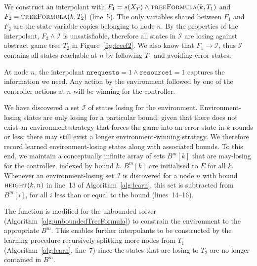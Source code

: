 We construct an interpolant with $F_1 = s(X_T) \land \textsc{treeFormula}(k,
T_1)$ and $F_2 = \textsc{treeFormula}(k, T_2)$ (line~5). The only variables
shared between $F_1$ and $F_2$ are the state variable copies belonging to node
$n$. By the properties of the interpolant, $F_2 \land \mathcal{I}$ is
unsatisfiable, therefore all states in $\mathcal{I}$ are losing against
abstract game tree $T_2$ in Figure~\ref{fig:treef2}.  We also know that $F_1
\to \mathcal{I}$, thus $\mathcal{I}$ contains all states reachable at $n$ by
following $T_1$ and avoiding error states. 

\begin {exmp}

    At node $n$, the interpolant $\texttt{nrequests} = 1 \land
    \texttt{resource1} = 1$ captures the information we need. Any action by the
    environment followed by one of the controller actions at $n$ will be
    winning for the controller.

\end{exmp}

We have discovered a set $\mathcal{I}$ of states losing for the environment.
Environment-losing states are only losing for a particular bound: given that
there does not exist an environment strategy that forces the game into an error
state in $k$ rounds or less; there may still exist a longer environment-winning
strategy.  We therefore record learned environment-losing states along with
associated bounds.  To this end, we maintain a conceptually infinite array of
sets $B^m[k]$ that are may-losing for the controller, indexed by bound $k$.
$B^m[k]$ are initialised to $E$ for all $k$.  Whenever an environment-losing
set $\mathcal{I}$ is discovered for a node $n$ with bound $\textsc{height}(k,
n)$ in line~13 of Algorithm~\ref{alg:learn}, this set is subtracted from
$B^m[i]$, for all $i$ less than or equal to the bound (lines~14--16).

The \textsc{} function is modified for the unbounded
solver (Algorithm~\ref{alg:unboundedTreeFormula}) to constrain the environment
to the appropriate $B^m$. This enables further interpolants to be constructed
by the learning procedure recursively splitting more nodes from $T_1$
(Algorithm~\ref{alg:learn}, line~7) since the states that are losing to $T_2$
are no longer contained in $B^m$.


